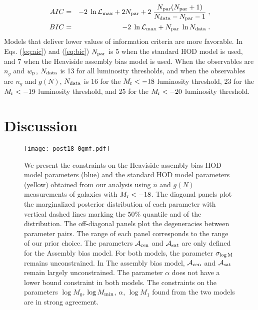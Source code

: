 \documentclass[14pt, preprint]{emulateapj}
\newcommand{\wpp}{w_{\rm p}}
\newcommand{\ngal}{n_{g}}
\newcommand{\gmf}{g(N)}
\newcommand{\mr}{M_{\rm r}}
\newcommand{\mzero}{\log M_{0}}
\newcommand{\mone}{\log M_{1}}
\newcommand{\mmin}{\log M_{\rm min}}
\newcommand{\sigmam}{\sigma_{\log \rm M}}
\newcommand{\acen}{\mathcal{A}_{\rm cen}}
\newcommand{\asat}{\mathcal{A}_{\rm sat}}
\begin{document}
\begin{eqnarray}
AIC&=& -2\;\ln \mathcal{L}_{\rm max} + 2N_{\rm par} + 2\;\frac{N_{\rm par}(N_{\rm par}+1)}{N_{\rm data}-N_{\rm par}-1} \; , \label{eq:aic}\\
BIC&=& -2\;\ln \mathcal{L}_{\rm max} + N_{\rm par}\;\ln N_{\rm data} \; . \label{eq:bic}
\end{eqnarray}
Models that deliver lower values of information criteria are more favorable. In Eqs. (\ref{eq:aic}) and (\ref{eq:bic}) $N_{\rm par}$ is 5 when the standard HOD model is used, and 7 when the Heaviside assembly bias model is used. When the observables are $\ngal$ and $\wpp$, $N_{\rm data}$ is 13 for all luminosity thresholds, and when the observables are $\ngal$ and $\gmf$, $N_{\rm data}$ is 16 for the $\mr < -18$ luminosity threshold, 23 for the $\mr < -19$ luminosity threshold, and 25 for the $\mr < -20$ luminosity threshold. 




\section{Discussion}




\begin{figure*}
\begin{center}
\texttt{[image: post18\_0gmf.pdf]}
\caption{We present the constraints on the Heaviside assembly bias HOD model parameters (blue) and the standard HOD model parameters (yellow) obtained from our analysis using $\bar{n}$ and $\gmf$ measurements of galaxies with $\mr < -18$. The diagonal panels plot the marginalized posterior distribution of each parameter with vertical dashed lines marking the $50\%$ quantile and of the distribution. The off-diagonal panels plot the degeneracies between parameter pairs. The range of each panel corresponds to the range of our prior choice. The parameters $\acen$ and $\asat$ are only defined for the Assembly bias model. For both models, the parameter $\sigmam$ remains unconstrained. In The assembly bias model, $\acen$ and $\asat$ remain largely unconstrained. The parameter $\alpha$ does not have a  lower bound constraint in both models. The constraints on the parameters $\mzero$, $\mmin$, $\alpha$, $\mone$ found from the two models are in strong agreement.}
\label{fig:post_gmf_18}
\end{center}
\end{figure*}
\end{document}
